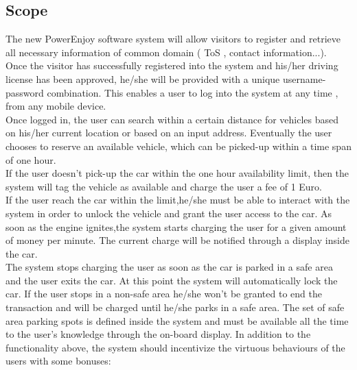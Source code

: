 \documentclass[12pt]{article}
\begin{document}
	 \subsection{\label{scope:1}Scope}
		The new PowerEnjoy software system will allow visitors to register and retrieve all 
		necessary information of common domain ( ToS , contact information...). \\Once the 
		visitor has successfully registered into the system and his/her driving license has been 
		approved, he/she will be provided with a unique username-password combination. This 
		enables a user to log into the system at any time , from any mobile device. \\Once 
		logged in, the user can search within a certain distance for vehicles based on his/her 
		current location or based on an input address. 
		Eventually the user chooses to reserve an available vehicle, which can be picked-up 
		within a time span of one hour.\\ 
		If the user doesn't pick-up the car within the one hour availability limit, then the 
		system will tag the vehicle as available and charge the user a fee of 1 Euro. \\
		If the user reach the car within the limit,he/she must be able to  interact with 
		the system in order to unlock the vehicle and grant the user access to the car.
		As soon as the engine ignites,the system starts charging the user for a given amount of 
		money per minute. The current charge will be notified through a display inside the car.	
		\\
		The system stops charging the user as soon as the car is parked in a safe area and the 
		user exits the car. At this point the system will automatically lock the car.
		If the user stops in a non-safe area he/she won't be granted to end the transaction 	
		and will be charged until  he/she parks in a safe area.
		The set of safe area parking spots is defined inside the system and must be available 	
		all the time to the user's knowledge through the on-board display.
		\newline
		In addition to the functionality above, the system should incentivize the virtuous 
		behaviours of the users with some bonuses:
\end{document}
